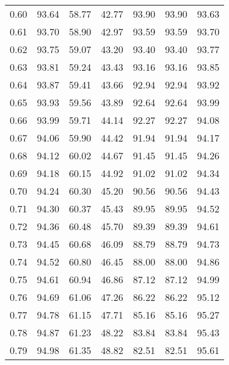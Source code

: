 \begin{tabular}{|c|c|c|c|c|c|c|}
      0.60 &     93.64 &     58.77 &      42.77 &   93.90 &      93.90 &         93.63 \\
      0.61 &     93.70 &     58.90 &      42.97 &   93.59 &      93.59 &         93.70 \\
      0.62 &     93.75 &     59.07 &      43.20 &   93.40 &      93.40 &         93.77 \\
      0.63 &     93.81 &     59.24 &      43.43 &   93.16 &      93.16 &         93.85 \\
      0.64 &     93.87 &     59.41 &      43.66 &   92.94 &      92.94 &         93.92 \\
      0.65 &     93.93 &     59.56 &      43.89 &   92.64 &      92.64 &         93.99 \\
      0.66 &     93.99 &     59.71 &      44.14 &   92.27 &      92.27 &         94.08 \\
      0.67 &     94.06 &     59.90 &      44.42 &   91.94 &      91.94 &         94.17 \\
      0.68 &     94.12 &     60.02 &      44.67 &   91.45 &      91.45 &         94.26 \\
      0.69 &     94.18 &     60.15 &      44.92 &   91.02 &      91.02 &         94.34 \\
      0.70 &     94.24 &     60.30 &      45.20 &   90.56 &      90.56 &         94.43 \\
      0.71 &     94.30 &     60.37 &      45.43 &   89.95 &      89.95 &         94.52 \\
      0.72 &     94.36 &     60.48 &      45.70 &   89.39 &      89.39 &         94.61 \\
      0.73 &     94.45 &     60.68 &      46.09 &   88.79 &      88.79 &         94.73 \\
      0.74 &     94.52 &     60.80 &      46.45 &   88.00 &      88.00 &         94.86 \\
      0.75 &     94.61 &     60.94 &      46.86 &   87.12 &      87.12 &         94.99 \\
      0.76 &     94.69 &     61.06 &      47.26 &   86.22 &      86.22 &         95.12 \\
      0.77 &     94.78 &     61.15 &      47.71 &   85.16 &      85.16 &         95.27 \\
      0.78 &     94.87 &     61.23 &      48.22 &   83.84 &      83.84 &         95.43 \\
      0.79 &     94.98 &     61.35 &      48.82 &   82.51 &      82.51 &         95.61 \\

\end{tabular}

